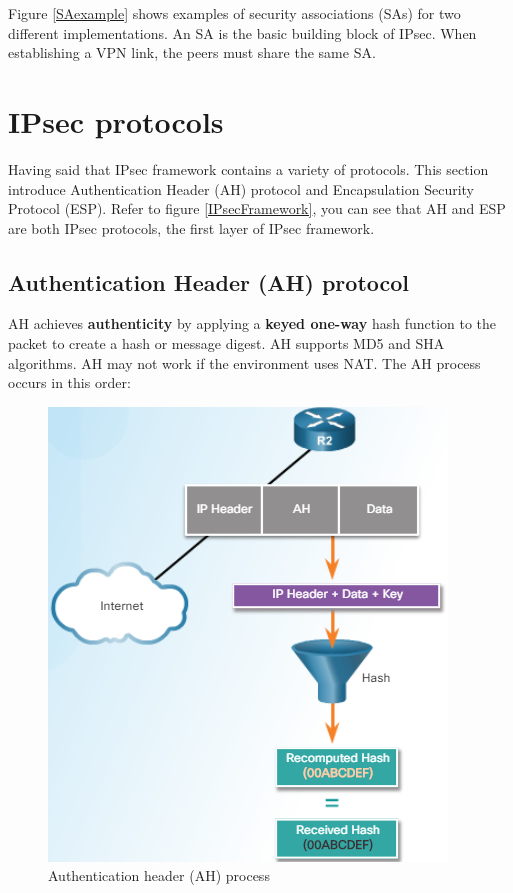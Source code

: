 Figure \ref{SAexample} shows examples of security associations (SAs) for two different implementations. An SA is the basic building block of IPsec. When establishing a VPN link, the peers must share the same SA. 

\section{IPsec protocols}

Having said that IPsec framework contains a variety of protocols. This section introduce Authentication Header (AH) protocol and Encapsulation Security Protocol (ESP). Refer to figure \ref{IPsecFramework}, you can see that AH and ESP are both IPsec protocols, the first layer of IPsec framework.

\subsection{Authentication Header (AH) protocol}

AH achieves \textbf{authenticity} by applying a \textbf{keyed one-way} hash function to the packet to create a hash or message digest. AH supports MD5 and SHA algorithms. AH may not work if the environment uses NAT. The AH process occurs in this order:

\begin{figure}[hbtp]
\caption{Authentication header (AH) process}\label{AHproto}
\centering
\includegraphics[scale=0.5]{pictures/AHproto.PNG}
\end{figure}


